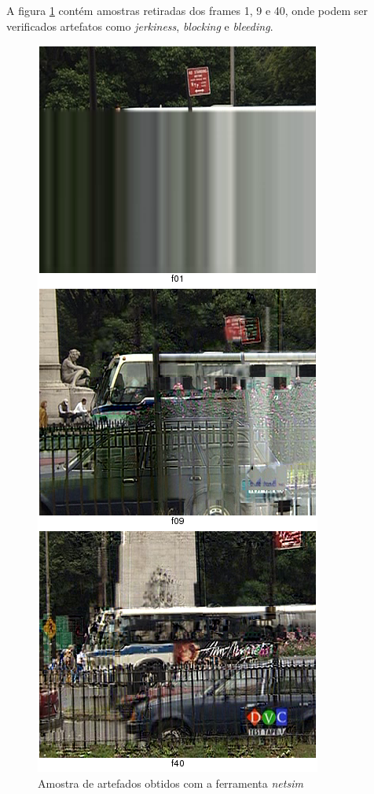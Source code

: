 A figura \ref{fig:netsim} contém amostras retiradas dos frames 1, 9 e 40, onde podem ser verificados artefatos como \emph{jerkiness}, \emph{blocking} e \emph{bleeding}.

\begin{figure}[!htb]
	\centering
	\includegraphics[height=0.9\textheight]{./imgs/netsimresult.png}
	\caption{Amostra de artefados obtidos com a ferramenta \emph{netsim}}
	\label{fig:netsim}
\end{figure}

